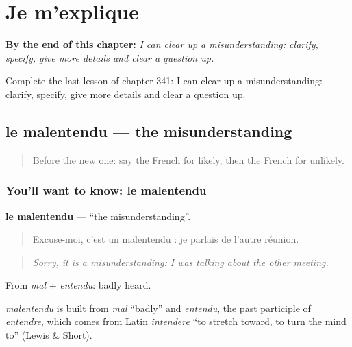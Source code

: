 
\chapter{Je m'explique}
\label{ch:fr-je-m-explique}

\begin{chapteropening}
\textbf{By the end of this chapter:} \emph{I can clear up a misunderstanding: clarify, specify, give more details and clear a question up.}

Complete the last lesson of chapter 341: I can clear up a misunderstanding: clarify, specify, give more details and clear a question up.
\end{chapteropening}

\section[le malentendu]{le malentendu — the misunderstanding}

\label{lesson:FR-C341-malentendu}



\begin{quote}
Before the new one: say the French for likely, then the French for unlikely.
\end{quote}

\subsection*{You'll want to know: le malentendu}
\textbf{le malentendu} — \textquotedblleft{}the misunderstanding\textquotedblright{}.

\begin{quote}
Excuse-moi, c'est un malentendu : je parlais de l'autre réunion.
\end{quote}

\begin{quote}
\emph{Sorry, it is a misunderstanding: I was talking about the other meeting.}
\end{quote}

From \emph{mal} + \emph{entendu}: badly heard.

\begin{cousinweb}
\emph{malentendu} is built from \emph{mal} \textquotedblleft{}badly\textquotedblright{} and \emph{entendu}, the past participle of \emph{entendre}, which comes from Latin \emph{intendere} \textquotedblleft{}to stretch toward, to turn the mind to\textquotedblright{} (Lewis \& Short).
\end{cousinweb}

